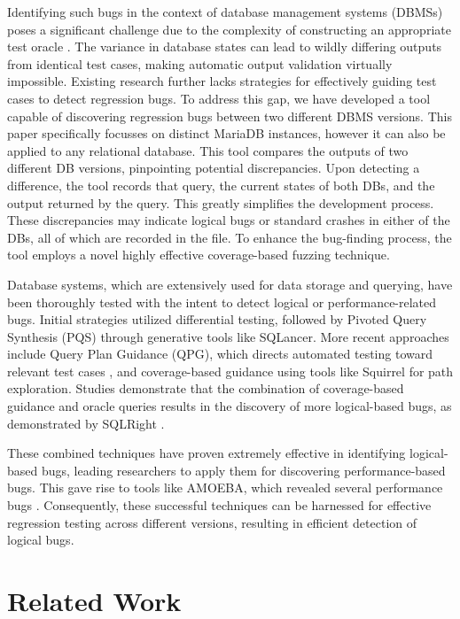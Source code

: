 \documentclass[sigconf]{acmart}
\begin{document}
Identifying such bugs in the context of database management systems (DBMSs) poses a significant challenge due to the complexity of constructing an appropriate test oracle \cite{rigger2020testing}. The variance in database states can lead to wildly differing outputs from identical test cases, making automatic output validation virtually impossible. Existing research further lacks strategies for effectively guiding test cases to detect regression bugs. To address this gap, we have developed a tool capable of discovering regression bugs between two different DBMS versions. This paper specifically focusses on distinct MariaDB instances, however it can also be applied to any relational database. This tool compares the outputs of two different DB versions, pinpointing potential discrepancies. Upon detecting a difference, the tool records that query, the current states of both DBs, and the output returned by the query. This greatly simplifies the development process. These discrepancies may indicate logical bugs or standard crashes in either of the DBs, all of which are recorded in the file. To enhance the bug-finding process, the tool employs a novel highly effective coverage-based fuzzing technique.

Database systems, which are extensively used for data storage and querying, have been thoroughly tested with the intent to detect logical or performance-related bugs. Initial strategies utilized differential testing, followed by Pivoted Query Synthesis (PQS) \cite{rigger2020testing} through generative tools like SQLancer. More recent approaches include Query Plan Guidance (QPG), which directs automated testing toward relevant test cases \cite{liang2022detecting}, and coverage-based guidance using tools like Squirrel \cite{zhong2020squirrel} for path exploration. Studies demonstrate that the combination of coverage-based guidance and oracle queries results in the discovery of more logical-based bugs, as demonstrated by SQLRight \cite{liang2022detecting}.

These combined techniques have proven extremely effective in identifying logical-based bugs, leading researchers to apply them for discovering performance-based bugs. This gave rise to tools like AMOEBA, which revealed several performance bugs \cite{9793961}. Consequently, these successful techniques can be harnessed for effective regression testing across different versions, resulting in efficient detection of logical bugs.

\section{Related Work}
\end{document}
